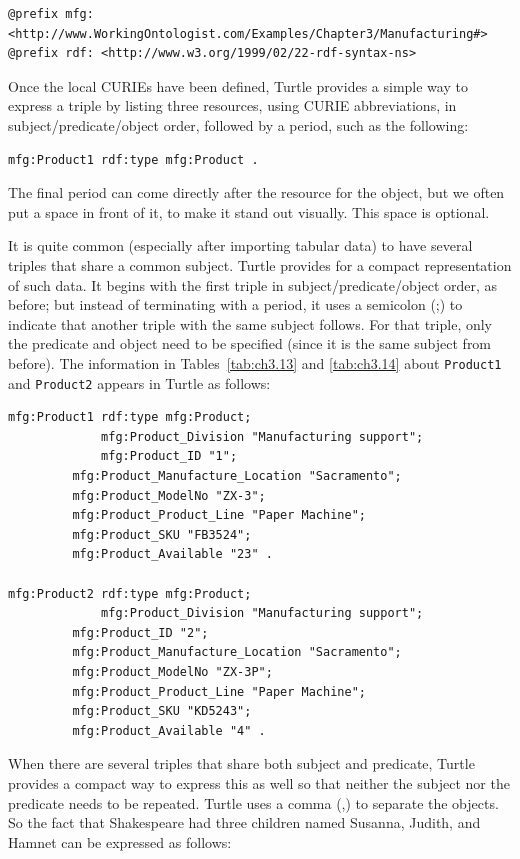 \begin{lstlisting}
@prefix mfg: <http://www.WorkingOntologist.com/Examples/Chapter3/Manufacturing#>
@prefix rdf: <http://www.w3.org/1999/02/22-rdf-syntax-ns> 
\end{lstlisting}

Once the local CURIEs have been defined, Turtle provides a  simple
way to express a triple by listing three resources, using CURIE
abbreviations, in subject/predicate/object order, followed by a period,
such as the following:

\begin{lstlisting}
mfg:Product1 rdf:type mfg:Product .
\end{lstlisting}

The final period can come directly after the resource for the object,
but we often put a space in front of it, to make it stand out visually.
This space is optional.

It is quite common (especially after importing tabular data) to have
several triples that share a common subject. Turtle provides for a
compact representation of such data. It begins with the first triple in
subject/predicate/object order, as before; but instead of terminating
with a period, it uses a semicolon (;) to indicate that another triple
with the same subject follows. For that triple, only the predicate and
object need to be specified (since it is the same subject from before).
The information in Tables~\ref{tab:ch3.13} and \ref{tab:ch3.14} about \texttt{Product1} and \texttt{Product2}
appears in Turtle as follows:

\begin{lstlisting}
mfg:Product1 rdf:type mfg:Product;
             mfg:Product_Division "Manufacturing support"; 
             mfg:Product_ID "1";
	     mfg:Product_Manufacture_Location "Sacramento";
	     mfg:Product_ModelNo "ZX-3"; 
	     mfg:Product_Product_Line "Paper Machine"; 
	     mfg:Product_SKU "FB3524";
	     mfg:Product_Available "23" .

mfg:Product2 rdf:type mfg:Product; 
             mfg:Product_Division "Manufacturing support"; 
	     mfg:Product_ID "2"; 
	     mfg:Product_Manufacture_Location "Sacramento"; 
	     mfg:Product_ModelNo "ZX-3P"; 
 	     mfg:Product_Product_Line "Paper Machine"; 
	     mfg:Product_SKU "KD5243";
	     mfg:Product_Available "4" .
\end{lstlisting}

When there are several triples that share both subject and predicate,
Turtle provides a compact way to express this as well so that neither
the subject nor the predicate needs to be repeated. Turtle uses a comma
(,) to separate the objects. So the fact that Shakespeare had three
children named Susanna, Judith, and Hamnet can be expressed as follows:

